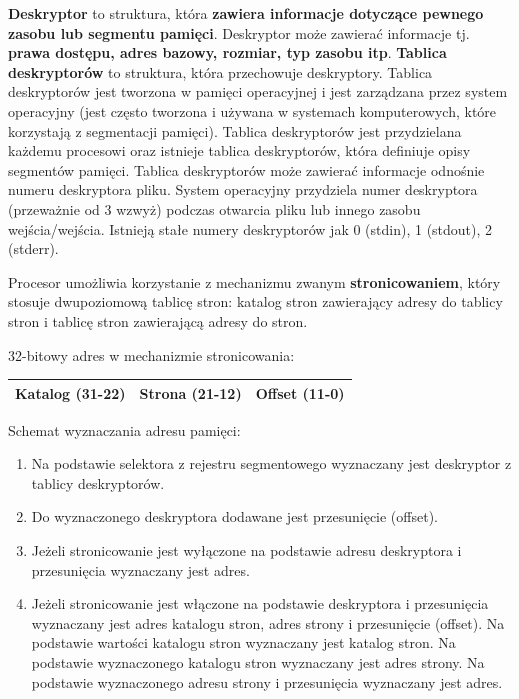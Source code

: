 \documentclass{article}
\begin{document}
\textbf{Deskryptor} to struktura, która \textbf{zawiera informacje dotyczące pewnego zasobu lub segmentu pamięci}. Deskryptor może zawierać informacje tj. \textbf{prawa dostępu, adres bazowy, rozmiar, typ zasobu itp}. \textbf{Tablica deskryptorów} to struktura, która przechowuje deskryptory. Tablica deskryptorów jest tworzona w pamięci operacyjnej i jest zarządzana przez system operacyjny (jest często tworzona i używana w systemach komputerowych, które korzystają z segmentacji pamięci). Tablica deskryptorów jest przydzielana każdemu procesowi oraz istnieje tablica deskryptorów, która definiuje opisy segmentów pamięci. Tablica deskryptorów może zawierać informacje odnośnie numeru deskryptora pliku. System operacyjny przydziela numer deskryptora (przeważnie od 3 wzwyż) podczas otwarcia pliku lub innego zasobu wejścia/wejścia. Istnieją stałe numery deskryptorów jak 0 (stdin), 1 (stdout), 2 (stderr).

Procesor umożliwia korzystanie z mechanizmu zwanym \textbf{stronicowaniem}, który stosuje dwupoziomową tablicę stron: katalog stron zawierający adresy do tablicy stron i tablicę stron zawierającą adresy do stron.

32-bitowy adres w mechanizmie stronicowania:
\begin{table}[ht]
\centering
\begin{tabular}{|c|c|c|}
    \hline
    \textbf{Katalog} (31-22) & \textbf{Strona} (21-12) & \textbf{Offset} (11-0) \\
    \hline
\end{tabular}
\end{table}

Schemat wyznaczania adresu pamięci:
\begin{enumerate}
    \item Na podstawie selektora z rejestru segmentowego wyznaczany jest deskryptor z tablicy deskryptorów.
    \item Do wyznaczonego deskryptora dodawane jest przesunięcie (offset).
    \item Jeżeli stronicowanie jest wyłączone na podstawie adresu deskryptora i przesunięcia wyznaczany jest adres. 
    \item Jeżeli stronicowanie jest włączone na podstawie deskryptora i przesunięcia wyznaczany jest adres katalogu stron, adres strony i przesunięcie (offset). Na podstawie wartości katalogu stron wyznaczany jest katalog stron. Na podstawie wyznaczonego katalogu stron wyznaczany jest adres strony. Na podstawie wyznaczonego adresu strony i przesunięcia wyznaczany jest adres.
\end{enumerate}
\end{document}
